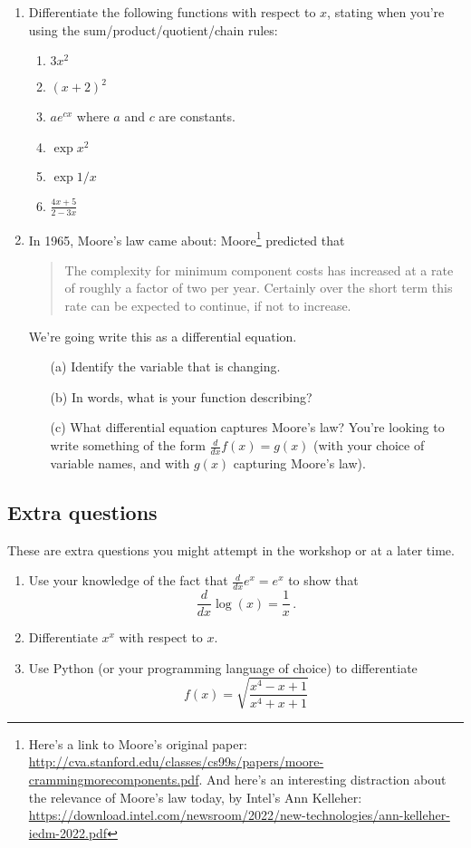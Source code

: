 \documentclass[11pt,a4paper]{scrartcl}
\begin{document}
\begin{enumerate}
\item Differentiate the following functions with respect to $x$, stating when you're using the sum/product/quotient/chain rules:
\begin{enumerate}
\item $3x^2$
\item $(x+2)^2$
\item $ae^{cx}$ where $a$ and $c$ are constants.
\item $\exp{x^2}$
\item $\exp{1/x}$
\item $\frac{4x+5}{2-3x}$
\end{enumerate}

\item In 1965, Moore's law came about: Moore\footnote{Here's a link to Moore's original paper: \url{http://cva.stanford.edu/classes/cs99s/papers/moore-crammingmorecomponents.pdf}. And here's an interesting distraction about the relevance of Moore's law today, by Intel's Ann Kelleher: \url{https://download.intel.com/newsroom/2022/new-technologies/ann-kelleher-iedm-2022.pdf} } predicted that 
\begin{quote}
    The complexity for minimum component costs has increased at a rate of roughly a factor of two per year. Certainly over the short term this rate
can be expected to continue, if not to increase.
\end{quote}  
We're going write this as a differential equation. 
\begin{enumerate}
    \item[(a)] Identify the variable that is changing.
    \item[(b)] In words, what is your function describing? 
    \item[(c)] What differential equation captures Moore's law? You're looking to write something of the form $\frac{d}{dx}f(x) = g(x)$ (with your choice of variable names, and with $g(x)$ capturing Moore's law).
\end{enumerate}
\end{enumerate}

\subsection*{Extra questions}

These are extra questions you might attempt in the workshop or at a later time.

\begin{enumerate}
\item Use your knowledge of the fact that $\frac{d}{dx}e^x = e^x$ to show that 
\[
\frac{d}{dx}\log(x) = \frac1x\,.
\]
\item Differentiate $x^x$ with respect to $x$.
\item Use Python (or your programming language of choice) to differentiate
\[
f(x) = \sqrt{\frac{x^4-x+1}{x^4+x+1}}
\]
\end{enumerate}
\end{document}
